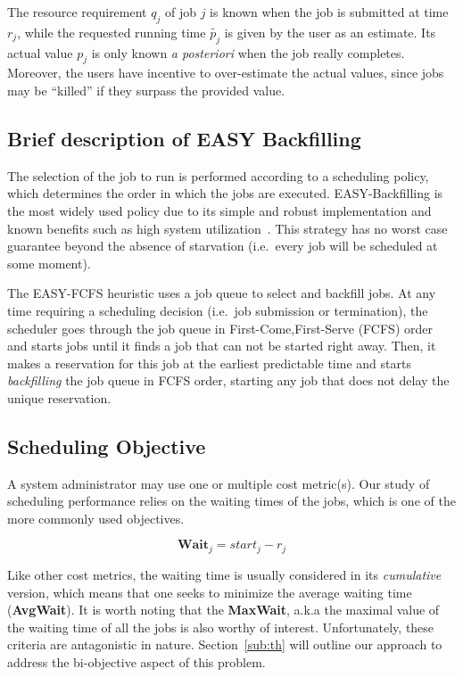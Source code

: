 \documentclass[sigconf,anonymous]{acmart}
\begin{document}
The resource requirement $q_j$ of job $j$ is known when the job is submitted at
time $r_j$, while the requested running time $\widetilde{p_j}$ is given by the
user as an estimate. Its actual value $p_j$ is only known \textit{a posteriori}
when the job really completes.  Moreover, the users have incentive to
over-estimate the actual values, since jobs may be ``killed'' if they surpass
the provided value.

\subsection{Brief description of EASY Backfilling}
\label{sub:easy}

The selection of the job to run is performed according to a scheduling policy,
which determines the order in which the jobs are executed. EASY-Backfilling is
the most widely used policy due to its simple and robust implementation and
known benefits such as high system utilization~\cite{easy}. This strategy has
no worst case guarantee beyond the absence of starvation (i.e.\ every job will
be scheduled at some moment).

The EASY-FCFS heuristic uses a job queue to select and backfill jobs.  At any
time requiring a scheduling decision (i.e.\ job submission or termination),
the scheduler goes through the job queue in First-Come,First-Serve (FCFS) order
and starts jobs until it finds a job that can not be started right away. Then,
it makes a reservation for this job at the earliest predictable time and
starts \textit{backfilling} the job queue in FCFS order, starting any job that
does not delay the unique reservation.

\subsection{Scheduling Objective}
\label{sub:scheduling_objectives}

A system administrator may use one or multiple cost metric(s). Our study of
scheduling performance relies on the waiting times of the jobs, which is one of
the more commonly used objectives.

     \begin{equation}
       \textbf{Wait}_j =  start_j-r_j
     \end{equation}

Like other cost metrics, the waiting time is usually considered in its
\textit{cumulative} version, which means that one seeks to minimize the average
waiting time (\textbf{AvgWait}). It is worth noting that the \textbf{MaxWait},
a.k.a the maximal value of the waiting time of all the jobs is also worthy of
interest. Unfortunately, these criteria are antagonistic in nature. Section~\ref{sub:th} will outline our
approach to address the bi-objective aspect of this problem.
\end{document}
